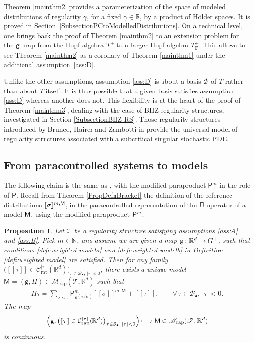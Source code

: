 \documentclass[11pt]{article}
\numberwithin{equation}{section}
\newcommand\mto{\mathchoice{\longmapsto}{\mapsto}{\mapsto}{\mapsto}}
\newcommand{\sbullet}{{\scriptscriptstyle\bullet}}
\theoremstyle{plain}
\newtheorem{prop}[thm]{Proposition}
\theoremstyle{definition}
\newcommand{\Brac}[1]{[\![#1]\!]}
\newcommand{\rap}{\mathrm{rap}}
\newcommand{\sfM}{\mathsf{M}}
\newcommand{\sfP}{\mathsf{P}}
\newcommand{\sfg}{\mathsf{g}}
\newcommand{\sfPi}{\mathsf{\Pi}}
\newcommand{\bsF}{\boldsymbol{F}}
\newcommand{\scrM}{\mathscr{M}}
\newcommand{\scrT}{\mathscr{T}}
\newcommand{\bbN}{\mathbb{N}}
\newcommand{\bbR}{\mathbb{R}}
\newcommand{\mcB}{\mathcal{B}}
\newcommand{\mcC}{\mathcal{C}}
\begin{document}
Theorem \ref{mainthm2} provides a parameterization of the space of modeled distributions of regularity $\gamma$, for a fixed $\gamma\in\bbR$, by a product of Hölder spaces. It is proved in Section~\ref{SubsectionPCtoModelledDistributions}. On a technical level, one brings back the proof of Theorem \ref{mainthm2} to an extension problem for the $\sf g$-map from the Hopf algebra $T^+$ to a larger Hopf algebra $T^+_{\bsF}$. This allows to see Theorem \ref{mainthm2} as a corollary of Theorem \ref{mainthm1} under the additional assumption~\eqref{ass:D}.

Unlike the other assumptions, assumption \eqref{ass:D} is about a basis $\mcB$ of $T$ rather than about $T$ itself. It is thus possible that a given basis satisfies assumption \eqref{ass:D} whereas another does not. This flexibility is at the heart of the proof of Theorem \ref{mainthm3}, dealing with the case of BHZ regularity structures, investigated in Section \ref{SubsectionBHZ-RS}. Those regularity structures introduced by Bruned, Hairer and Zambotti in \cite{BHZ} provide the universal model of regularity structures associated with a subcritical singular stochastic PDE.

\subsection{From paracontrolled systems to models}
\label{SubsectionPCtoModels}

The following claim is the same as \cite[Cor.\,15]{BH}, with the modified paraproduct $\sfP^m$ in the role of $\sfP$. Recall from Theorem \ref{PropDefnBracket} the definition of the reference distributions $\Brac{\sigma}^{m,\sf M}$, in the paracontrolled representation of the $\sf \Pi$ operator of a model $\sf M$, using the modified paraproduct ${\sf P}^m$.

\begin{prop} \label{modifiedCorUniqueExtension}
Let $\scrT$ be a regularity structure satisfying assumptions \eqref{ass:A} and \eqref{ass:B}. Pick $m\in\bbN$, and assume we are given a map ${\sf g}:\bbR^d\to G^+$, such that conditions \eqref{defi:weighted modela} and \eqref{defi:weighted modelb} in Definition \ref{defi:weighted model} are satisfied. Then for any family $\bigl(\Brac{\tau}\in \mcC_\rap^{|\tau|}(\bbR^d)\bigr)_{\tau\in\mcB_\sbullet,\, |\tau|<0}$, there exists a unique model $\sfM=(\sfg,\sfPi)\in\scrM_\rap(\scrT,\bbR^d)$ such that
\begin{align} \label{modifiedCorUniqueExtension:formula}
\sfPi\tau = \sum_{\sigma<\tau} \sfP^m_{\sfg(\tau/\sigma)}\Brac{\sigma}^{m,\sfM} + \Brac{\tau}, \qquad \forall\,\tau\in\mcB_\sbullet, \,\vert\tau\vert<0.
\end{align}
The map
\[
\Bigl(\sfg, \bigl(\Brac{\tau}\in \mcC_\rap^{|\tau|}(\bbR^d)\bigr)_{\tau\in\mcB_\sbullet,\, |\tau|<0}\Bigr) \mto {\sf M} \in \scrM_\rap(\scrT,\bbR^d)
\]
is continuous.
\end{prop}
\end{document}
